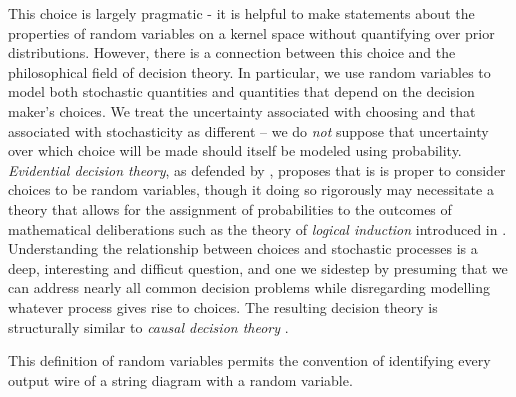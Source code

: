 This choice is largely pragmatic - it is helpful to make statements about the properties of random variables on a kernel space without quantifying over prior distributions. However, there is a connection between this choice and the philosophical field of decision theory. In particular, we use random variables to model both stochastic quantities and quantities that depend on the decision maker's choices. We treat the uncertainty associated with choosing and that associated with stochasticity as different -- we do \emph{not} suppose that uncertainty over which choice will be made should itself be modeled using probability. \emph{Evidential decision theory}, as defended by \citet{jeffrey_logic_1981}, proposes that is is proper to consider choices to be random variables, though it  doing so rigorously may necessitate a theory that allows for the assignment of probabilities to the outcomes of mathematical deliberations such as the theory of \emph{logical induction} introduced in \citet{garrabrant_logical_2017}. Understanding the relationship between choices and stochastic processes is a deep, interesting and difficut question, and one we sidestep by presuming that we can address nearly all common decision problems while disregarding modelling whatever process gives rise to choices. The resulting decision theory is structurally similar to \emph{causal decision theory} \citep{lewis_causal_1981}.

This definition of random variables permits the convention of identifying every output wire of a string diagram with a random variable. 



